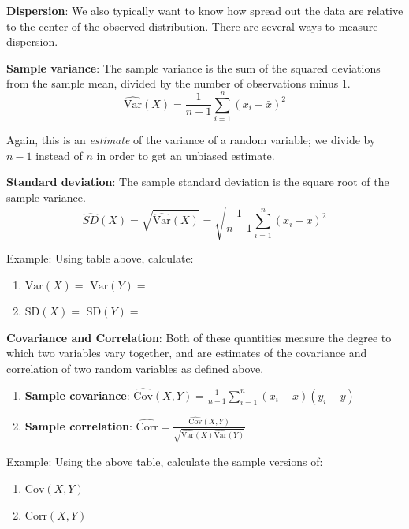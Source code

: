 \documentclass[]{book}
\providecommand{\tightlist}{%
  \setlength{\itemsep}{0pt}\setlength{\parskip}{0pt}}
\newcommand{\SD}{\mathrm{SD}}
\theoremstyle{definition}
\theoremstyle{definition}
\theoremstyle{definition}
\theoremstyle{remark}
\let\BeginKnitrBlock\begin \let\EndKnitrBlock\end
\begin{document}
\textbf{Dispersion}: We also typically want to know how spread out the data are relative to the center of the observed distribution. There are several ways to measure dispersion.

\textbf{Sample variance}: The sample variance is the sum of the squared deviations from the sample mean, divided by the number of observations minus 1.
\[ \hat{\text{Var}}(X) = \frac{1}{n-1}\sum_{i = 1}^n (x_i - \bar{x})^2\]

Again, this is an \emph{estimate} of the variance of a random variable; we divide by \(n - 1\) instead of \(n\) in order to get an unbiased estimate.

\textbf{Standard deviation}: The sample standard deviation is the square root of the sample variance.
\[ \hat{SD}(X) = \sqrt{\hat{\text{Var}}(X)} = \sqrt{\frac{1}{n-1}\sum_{i = 1}^n (x_i - \bar{x})^2}\]

\begin{framed}
Example: Using table above, calculate: 
\begin{enumerate}
\item $\text{Var}(X) = $ \hspace{1.5cm} $\text{Var}(Y) =$
\item $\SD(X) = $ \hspace{1.65cm} $\SD(Y) =$
\end{enumerate}
\end{framed}

\textbf{Covariance and Correlation}: Both of these quantities measure the degree to which two variables vary together, and are estimates of the covariance and correlation of two random variables as defined above.

\begin{enumerate}
\def\labelenumi{\arabic{enumi}.}
\tightlist
\item
  \textbf{Sample covariance}: \(\hat{\text{Cov}}(X,Y) = \frac{1}{n-1}\sum_{i = 1}^n(x_i - \bar{x})(y_i - \bar{y})\)
\item
  \textbf{Sample correlation}: \(\hat{\text{Corr}} = \frac{\hat{\text{Cov}}(X,Y)}{\sqrt{\hat{\text{Var}}(X)\hat{\text{Var}}(Y)}}\)
\end{enumerate}

\BeginKnitrBlock{example}
\protect\hypertarget{exm:unnamed-chunk-94}{}{\label{exm:unnamed-chunk-94} }Example: Using the above table, calculate the sample versions of:

\begin{enumerate}
\def\labelenumi{\arabic{enumi}.}
\tightlist
\item
  \(\text{Cov}(X,Y)\)
\item
  \(\text{Corr}(X, Y)\)
\end{enumerate}
\EndKnitrBlock{example}
\end{document}
